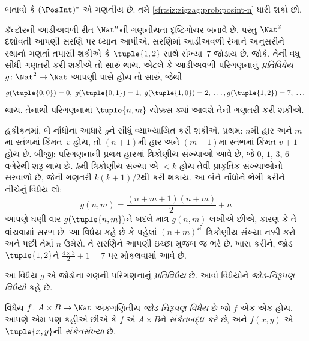 \begin{prob}\label{sfr:siz:zigzag:prob:posint-star}
બતાવો કે $(\PosInt)^*$ એ ગણનીય છે.
તમે \cref{sfr:siz:zigzag:prob:posint-n} ધારી શકો છો.
\end{prob}
\endgroup


\begingroup
\makeatletter{}\makeatother

\label{guunit:OLP-0031}


\begin{explain}
કૅન્ટૉરની આડીઅવળી રીત $\Nat^n$ની ગણનીયતા દૃષ્ટિગોચર
બનાવે છે. પરંતુ $\Nat^2$ દર્શાવતી આપણી સરણિ પર
ધ્યાન આપીએ. સરણિમાં આડીઅવળી રેખાને અનુસરીને સ્થાનો
ગણતાં તપાસી શકીએ કે $\tuple{1,2}$ સાથે સંખ્યા~$7$
જોડાય છે. જોકે, તેની વધુ સીધી ગણતરી કરી શકીએ તો
સારું થાય. એટલે કે આડીઅવળી પરિગણનાનું
\emph{પ્રતિવિધેય} $g\colon \Nat^2 \to \Nat$
આપણી પાસે હોય તો સારું, જેથી
\[
g(\tuple{0,0}) = 0, \;
g(\tuple{0,1}) = 1, \;
g(\tuple{1,0}) = 2, \; \dots,
g(\tuple{1,2}) = 7, \; \dots
\]
થાય. તેનાથી પરિગણનામાં $\tuple{n, m}$ ચોક્કસ
ક્યાં આવશે તેની ગણતરી કરી શકીએ.

હકીકતમાં, બે નોંધોના આધારે $g$ને સીધું વ્યાખ્યાયિત
કરી શકીએ. પ્રથમ: $n$મી હાર અને $m$મા સ્તંભમાં
કિંમત~$v$ હોય, તો $(n+1)$મી હાર અને $(m-1)$મા
સ્તંભમાં કિંમત $v + 1$ હોય છે. બીજી: પરિગણનાની
પ્રથમ હારમાં ત્રિકોણીય સંખ્યાઓ આવે છે, જે
$0$, $1$, $3$, $6$ વગેરેથી શરૂ થાય છે.
$k$મી ત્રિકોણીય સંખ્યા એ $< k$ હોય તેવી પ્રાકૃતિક
સંખ્યાઓનો સરવાળો છે, જેની ગણતરી $k(k+1)/2$થી
કરી શકાય. આ બંને નોંધોને ભેગી કરીને નીચેનું વિધેય લો:
\[
  g(n,m) = \frac{(n+m+1)(n+m)}{2} + n
\]
આપણે ઘણી વાર $g(\tuple{n, m})$ને બદલે માત્ર
$g(n, m)$ લખીએ છીએ, કારણ કે તે વાંચવામાં સરળ છે.
આ વિધેય કહે છે કે પહેલાં $(n+m)^\text{મી}$
ત્રિકોણીય સંખ્યા નક્કી કરો અને પછી તેમાં $n$ ઉમેરો.
તે સરણિને આપણી ઇચ્છા મુજબ જ ભરે છે.
ખાસ કરીને, જોડ $\tuple{1, 2}$ને
$\frac{4 \times 3}{2} +
1 = 7$ પર મોકલવામાં આવે છે.

આ વિધેય $g$ એ જોડોના ગણની પરિગણનાનું
\emph{પ્રતિવિધેય} છે. આવાં વિધેયોને
\emph{જોડ-નિરૂપણ વિધેયો} કહે છે.
\end{explain}

\begin{defn}[જોડ-નિરૂપણ વિધેય]
વિધેય $f\colon A \times B \to \Nat$ અંકગણિતીય
\emph{જોડ-નિરૂપણ વિધેય} છે જો $f$ એક-એક હોય.
આપણે એમ પણ કહીએ છીએ કે $f$ એ $A \times B$ને
\emph{સંકેતબદ્ધ કરે છે}, અને $f(x,y)$ એ
$\tuple{x,y}$ની \emph{સંકેતસંખ્યા} છે.
\end{defn}

